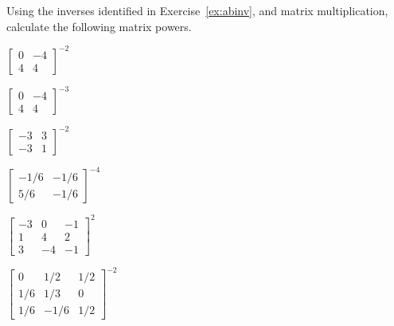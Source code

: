 \begin{exercise} \label{ex:} 
Using the inverses identified in Exercise~\ref{ex:abinv}, and matrix multiplication, calculate the following matrix powers.
\begin{parts}
\item \(\begin{bmatrix} 0&-4\\4&4 \end{bmatrix}^{-2}\)

\item \(\begin{bmatrix} 0&-4\\4&4 \end{bmatrix}^{-3}\)

\item \(\begin{bmatrix} -3&3
\\-3&1 \end{bmatrix}^{-2}\)

\item \(\begin{bmatrix} -1/6&-1/6
\\5/6&-1/6 \end{bmatrix}^{-4}\)

\item \(\begin{bmatrix} -3&0&-1
\\1&4&2
\\3&-4&-1 \end{bmatrix}^2\)

\item \(\begin{bmatrix} 0&1/2&1/2
\\1/6&1/3&0
\\1/6&-1/6&1/2 \end{bmatrix}^{-2}\)


\end{parts}
\end{exercise}
